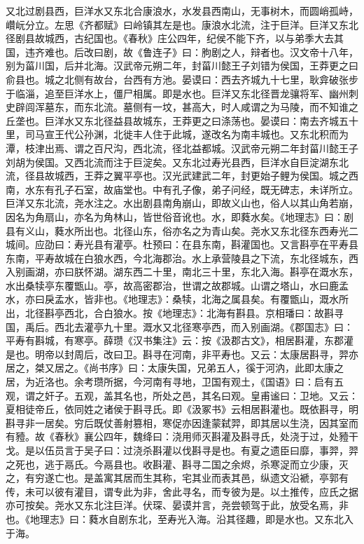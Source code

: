 \documentclass[12pt,UTF8]{ctexbook}
\begin{document}
又北过剧县西，巨洋水又东北合康浪水，水发县西南山，无事树木，而圆峭孤峙，巑岏分立。左思《齐都赋》曰岭镇其左是也。康浪水北流，注于巨洋。巨洋又东北径剧县故城西，古纪国也。《春秋》庄公四年，纪侯不能下齐，以与弟季大去其国，违齐难也。后改曰剧，故《鲁连子》曰：朐剧之人，辩者也。汉文帝十八年，别为菑川国，后并北海。汉武帝元朔二年，封菑川懿王子刘错为侯国，王莽更之曰俞县也。城之北侧有故台，台西有方池。晏谟曰：西去齐城九十七里，耿弇破张步于临淄，追至巨洋水上，僵尸相属。即是水也。巨洋又东北径晋龙骧将军、幽州刺史辟闾浑墓东，而东北流。墓侧有一坟，甚高大，时人咸谓之为马陵，而不知谁之丘垄也。巨洋水又东北径益县故城东，王莽更之曰涤荡也。晏谟曰：南去齐城五十里，司马宣王代公孙渊，北徙丰人住于此城，遂改名为南丰城也。又东北积而为潭，枝津出焉、谓之百尺沟，西北流，径北益都城。汉武帝元朔二年封菑川懿王子刘胡为侯国。又西北流而注于巨淀矣。又东北过寿光县西，巨洋水自巨淀湖东北流，径县故城西，王莽之翼平亭也。汉光武建武二年，封更始子鲤为侯国。城之西南，水东有孔子石室，故庙堂也。中有孔子像，弟子问经，既无碑志，未详所立。巨洋又东北流，尧水注之。水出剧县南角崩山，即故义山也，俗人以其山角若崩，因名为角扇山，亦名为角林山，皆世俗音讹也。水，即蕤水矣。《地理志》曰：剧县有义山，蕤水所出也。北径山东，俗亦名之为青山矣。尧水又东北径东西寿光二城间。应劭曰：寿光县有灌亭。杜预曰：在县东南，斟灌国也。又言斟亭在平寿县东南，平寿故城在白狼水西，今北海郡治。水上承营陵县之下流，东北径城东，西入别画湖，亦曰朕怀湖。湖东西二十里，南北三十里，东北入海。斟亭在溉水东，水出桑犊亭东覆甑山。亭，故高密郡治，世谓之故郡城。山谓之塔山，水曰鹿孟水，亦曰戾孟水，皆非也。《地理志》：桑犊，北海之属县矣。有覆甑山，溉水所出，北径斟亭西北，合白狼水。按《地理志》：北海有斟县。京相璠曰：故斟寻国，禹后。西北去灌亭九十里。溉水又北径寒亭西，而入别画湖。《郡国志》曰：平寿有斟城，有寒亭。薛瓒《汉书集注》云：按《汲郡古文》，相居斟灌，东郡灌是也。明帝以封周后，改曰卫。斟寻在河南，非平寿也。又云：太康居斟寻，羿亦居之，桀又居之。《尚书序》曰：太康失国，兄弟五人，徯于河汭，此即太康之居，为近洛也。余考瓒所据，今河南有寻地，卫国有观土，《国语》曰：启有五观，谓之奸子。五观，盖其名也，所处之邑，其名曰观。皇甫谧曰：卫地。又云：夏相徒帝丘，依同姓之诸侯于斟寻氏。即《汲冢书》云相居斟灌也。既依斟寻，明斟寻非一居矣。穷后既仗善射篡相，寒促亦因逢蒙弑羿，即其居以生浇，因其室而有豷。故《春秋》襄公四年，魏绛曰：浇用师灭斟灌及斟寻氏，处浇于过，处豷干戈。是以伍员言于吴子曰：过浇杀斟灌以伐斟寻是也。有夏之遗臣曰靡，事羿，羿之死也，逃于鬲氏。今鬲县也。收斟灌、斟寻二国之余烬，杀寒浞而立少康，灭之，有穷遂亡也。是盖寓其居而生其称，宅其业而表其邑，纵遗文沿褫，亭郭有传，未可以彼有灌目，谓专此为非，舍此寻名，而专彼为是。以土推传，应氏之据亦可按矣。尧水又东北注巨洋。伏琛、晏谟并言，尧尝顿驾于此，放受名焉，非也。《地理志》曰：蕤水自剧东北，至寿光入海。沿其径趣，即是水也。又东北入于海。
\end{document}
